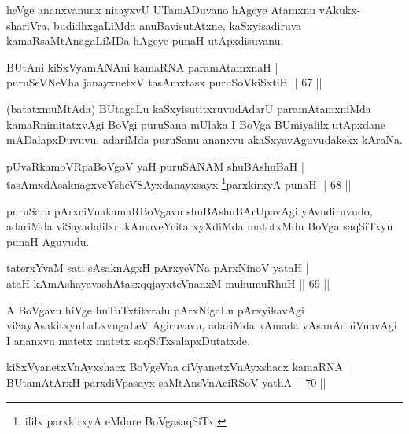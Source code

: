 \begin{artha}
heVge ananxvanunx nitayxvU UTamADuvano hAgeye Atamxnu vAkukx-shariVra. budidhxgaLiMda 
anuBavisutAtxne, kaSxyisadiruva kamaRsaMtAnagaLiMDa hAgeye punaH utApxdisuvanu.
\end{artha}


\begin{shl}
BUtAni kiSxVyamANAni kamaRNA paramAtamxnaH |\\
puruSeVNeVha janayxnetxV tasAmxtasx puruSoV\s kiSxtiH \hfill || 67 ||
\end{shl}

\begin{artha}
(batatxmuMtAda) BUtagaLu kaSxyisutitxruvudAdarU paramAtamxniMda kamaRnimitatxvAgi BoVgi puruSana mUlaka I BoVga BUmiyalilx utApxdane mADalapxDuvuvu, adariMda puruSanu ananxvu akaSxyavAguvudakekx kAraNa.
\end{artha}

\begin{shl}
pUvaRkamoVRpaBoVgoV yaH puruSANAM shuBAshuBaH |\\
tasAmxdAsaknagxveYsheVSAyxdanayxsayx \footnote{ililx parxkirxyA eMdare BoVgasaqSiTx.}parxkirxyA punaH \hfill || 68 ||
\end{shl}

\begin{artha}
puruSara pArxciVnakamaRBoVgavu shuBAshuBArUpavAgi yAvudiruvudo, adariMda viSayadalilxrukAmaveYcitarxyXdiMda matotxMdu BoVga saqSiTxyu punaH Aguvudu.
\end{artha}

\begin{shl}
taterxYvaM sati sAsaknAgxH pArxyeVNa pArxNinoV yataH |\\
ataH kAmAshayavashAtasxqqjayxteV\s nanxM muhumuRhuH \hfill || 69 ||
\end{shl}

\begin{artha}
A BoVgavu hiVge huTuTxtitxralu pArxNigaLu pArxyikavAgi viSayAsakitxyuLaLxvugaLeV Agiruvavu, adariMda kAmada vAsanAdhiVnavAgi I ananxvu matetx matetx saqSiTxsalapxDutatxde.
\end{artha}

\begin{shl}
kiSxVyanetxV\s nAyxshacx BoVgeVna ciVyanetxV\s nAyxshacx kamaRNA |\\
BUtamAtArxH parxdiVpasayx saMtAneVnAciRSoV yathA \hfill || 70 ||
\end{shl}

